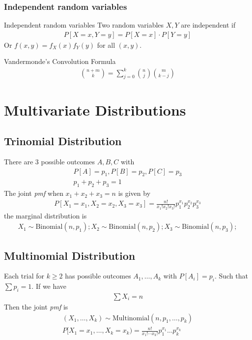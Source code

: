 \documentclass[16pt,a4paper]{article}
\begin{document}
\subsubsection{Independent random variables}
\begin{defn}{Independent random variables}
    Two random variables $X,Y$ are independent if
    \begin{align*}
        P[X=x, Y=y] = P[X=x]\cdot P[Y=y]
    \end{align*}
    Or $f(x,y) = f_X(x)f_Y(y)$ for all $(x,y)$. 
\end{defn}
\newpage
\newpage
\begin{thm}{Vandermonde's Convolution Formula}
    \begin{align*}
        {n+m \choose k} = \sum_{j=0}^k {n \choose j}{m \choose k-j}
    \end{align*}
\end{thm}
\section{Multivariate Distributions}
\subsection{Trinomial Distribution}
There are 3 possible outcomes $A,B,C$ with 
\begin{align*}
    P[A] = p_1, P[B] = p_2, P[C] = p_3\\
    p_1+p_2+p_3 = 1
\end{align*} 
The joint \textit{pmf} when $x_1+x_2 +x_3 = n$ is given by 
\begin{align*}
    P[X_1 = x_1, X_2 = x_2, X_3 = x_3] = \frac{n!}{x_1!x_2!x_3!}p_1^{x_1}p_2^{x_2}p_3^{x_3}
\end{align*}
the marginal distribution is
\begin{align*}
    X_1 \sim \text{Binomial}(n,p_1);
    X_2 \sim \text{Binomial}(n,p_2);
    X_3 \sim \text{Binomial}(n,p_3);
\end{align*} 
\subsection{Multinomial Distribution}
Each trial for $k\geq 2$ has possible outcomes $A_1, \ldots, A_k$ with $P[A_i] = p_i$. Such that $\sum p_i = 1$. If we have 
\begin{align*}
    \sum X_i = n
\end{align*}
Then the joint \textit{pmf} is 
\begin{align*}
    (X_1, \ldots, X_k) \sim \text{Multinomial}(n, p_1, \ldots, p_k)\\
    P[X_1 = x_1, \ldots, X_k = x_k) =  \frac{n!}{x_1!\cdots x_k!}p_1^{x_1}\ldots p_k^{x_k}
\end{align*}
\newpage
\end{document}
